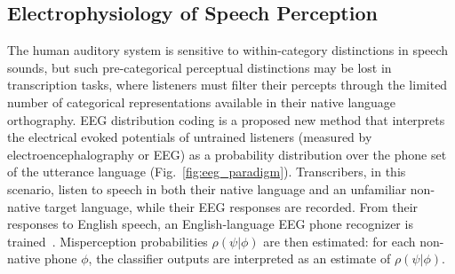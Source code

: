 \subsection{Electrophysiology of Speech Perception}

The human auditory system is sensitive to within-category distinctions
in speech sounds, but such pre-categorical perceptual distinctions may
be lost in transcription tasks, where listeners must filter their
percepts through the limited number of categorical representations
available in their native language orthography.  EEG distribution
coding is a proposed new method that interprets the electrical evoked
potentials of untrained listeners (measured by
electroencephalography or EEG) as a probability distribution
over the phone set of the utterance language
(Fig.~\ref{fig:eeg_paradigm}).  Transcribers, in this scenario, listen
to speech in both their native language and an unfamiliar non-native
target language, while their EEG responses are recorded.  From their
responses to English speech, an English-language EEG phone recognizer
is trained~\cite{Liberto15}.  Misperception probabilities
$\rho(\psi|\phi)$ are then estimated: for each non-native phone
$\phi$, the classifier outputs are interpreted as an estimate of
$\rho(\psi|\phi)$.

